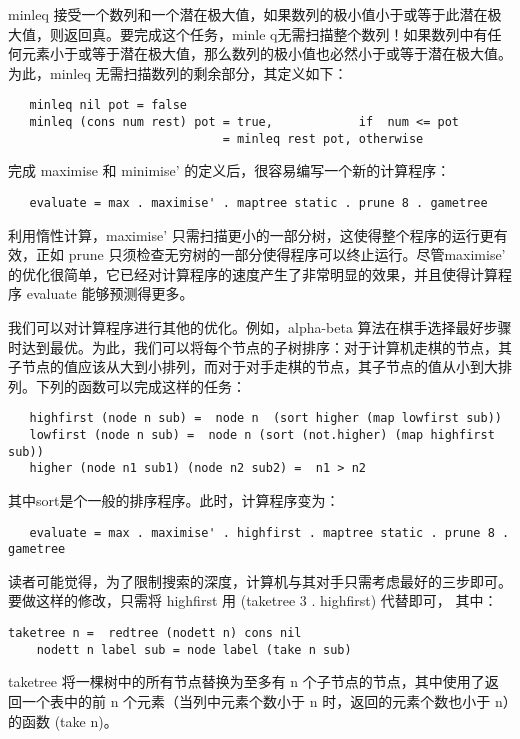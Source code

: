 \documentclass[12pt,a4paper]{article}
\begin{document}
minleq 接受一个数列和一个潜在极大值，如果数列的极小值小于或等于此潜在极大值，则返回真。要完成这个任务，minle q无需扫描整个数列！如果数列中有任何元素小于或等于潜在极大值，那么数列的极小值也必然小于或等于潜在极大值。为此，minleq 无需扫描数列的剩余部分，其定义如下：

\begin{verbatim}
   minleq nil pot = false
   minleq (cons num rest) pot = true,            if  num <= pot
                              = minleq rest pot, otherwise
\end{verbatim}

完成 maximise 和 minimise' 的定义后，很容易编写一个新的计算程序：

\begin{verbatim}
   evaluate = max . maximise' . maptree static . prune 8 . gametree
\end{verbatim}

利用惰性计算，maximise' 只需扫描更小的一部分树，这使得整个程序的运行更有效，正如 prune 只须检查无穷树的一部分使得程序可以终止运行。尽管maximise' 的优化很简单，它已经对计算程序的速度产生了非常明显的效果，并且使得计算程序 evaluate 能够预测得更多。

我们可以对计算程序进行其他的优化。例如，alpha-beta 算法在棋手选择最好步骤时达到最优。为此，我们可以将每个节点的子树排序：对于计算机走棋的节点，其子节点的值应该从大到小排列，而对于对手走棋的节点，其子节点的值从小到大排列。下列的函数可以完成这样的任务： 

\begin{verbatim}
   highfirst (node n sub) =  node n  (sort higher (map lowfirst sub))
   lowfirst (node n sub) =  node n (sort (not.higher) (map highfirst sub))
   higher (node n1 sub1) (node n2 sub2) =  n1 > n2
\end{verbatim}

其中sort是个一般的排序程序。此时，计算程序变为：
\begin{verbatim}
   evaluate = max . maximise' . highfirst . maptree static . prune 8 . gametree
\end{verbatim}

读者可能觉得，为了限制搜索的深度，计算机与其对手只需考虑最好的三步即可。要做这样的修改，只需将 highfirst 用 (taketree 3 . highfirst) 代替即可， 其中：

\begin{verbatim}
taketree n =  redtree (nodett n) cons nil
    nodett n label sub = node label (take n sub)
\end{verbatim}

taketree 将一棵树中的所有节点替换为至多有 n 个子节点的节点，其中使用了返回一个表中的前 n 个元素（当列中元素个数小于 n 时，返回的元素个数也小于 n）的函数 (take n)。
\end{document}
